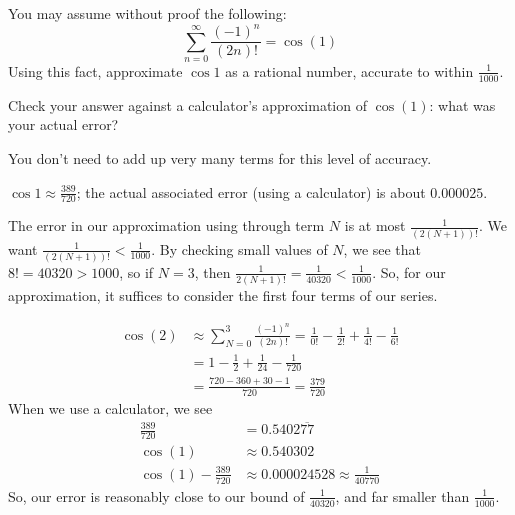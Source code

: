 \begin{Mquestion}
You may assume without proof the following:
\[\sum_{n=0}^\infty \frac{(-1)^n}{(2n)!} = \cos(1)\]
Using this fact, approximate $\cos 1$ as a rational number, accurate to within $\frac1{1000}$.

Check your answer against a calculator's approximation of $\cos(1)$: what was your actual error?
\end{Mquestion}
\begin{hint}
You don't need to add up very many terms for this level of accuracy.
\end{hint}
\begin{answer}
$\cos 1 \approx \frac{389}{720}$; the actual associated error (using a calculator) is about
$0.000025$.
\end{answer}
\begin{solution}
The error in our approximation using through term $N$ is at most $\frac{1}{(2(N+1))!}$. We want $\frac{1}{(2(N+1))!}<\frac{1}{1000}$. By checking small values of $N$, we see that $8!=40320>1000$, so if $N=3$, then $\frac{1}{2(N+1)!}=\frac{1}{40320}<\frac{1}{1000}$. So, for our approximation, it suffices to consider the first four terms of our series.

\begin{align*}
\cos(2)&\approx \sum_{N=0}^3 \frac{(-1)^n}{(2n)!} = \frac{1}{0!}-\frac{1}{2!}+\frac{1}{4!}-\frac{1}{6!}\\
&=1-\frac12+\frac{1}{24}-\frac{1}{720}\\
&=\frac{720-360+30-1}{720}=\frac{379}{720}
\end{align*}
When we use a calculator, we see
\begin{align*}
\frac{389}{720}&=0.5402\overline{77} \\
\cos(1)&\approx  0.540302\\
\cos(1) - \frac{389}{720}&\approx 0.000024528\approx \frac{1}{40770}
\end{align*}
So, our error is reasonably close to our bound of $\frac{1}{40320}$, and far smaller than $\frac{1}{1000}$.
\end{solution}







